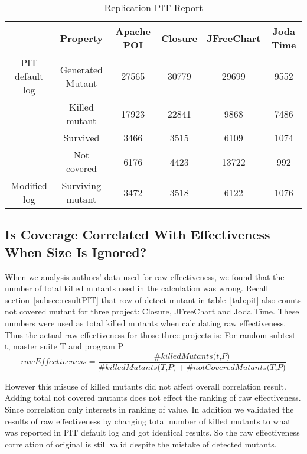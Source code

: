 \begin{table}[h]
	\caption{Replication PIT Report}
	\label{tab:pitrep}
	\begin{minipage}{\columnwidth}
		\begin{center}
			\begin{tabular}{|c|c|c|c|c|c|}
				\hline
				&Property & Apache POI & Closure & JFreeChart & Joda Time \\
				\hline
				PIT default log & Generated Mutant & 27565 & 30779 & 29699 & 9552\\
				& Killed mutant & 17923 & 22841  &9868 & 7486\\
				& Survived & 3466 & 3515 &6109 & 1074\\
				& Not covered & 6176 & 4423 & 13722 & 992\\
				\hline
				Modified log & Surviving mutant & 3472 & 3518 & 6122& 1076\\
				\hline
			\end{tabular}
		\end{center}
		\bigskip
	\end{minipage}
\end{table}

\subsection{Is Coverage Correlated With Effectiveness When Size Is Ignored?}
When we analysis authors' data used for raw effectiveness, we found that the number of total killed mutants used in the calculation was wrong. Recall section~\ref{subsec:resultPIT} that row of detect mutant in table~\ref{tab:pit} also counts not covered mutant for three project: Closure, JFreeChart and Joda Time. These numbers were used as total killed mutants when calculating raw effectiveness. Thus the actual raw effectiveness for those three projects is:
For random subtest t, master suite T and program P
\[\textit{rawEffectiveness} = \frac{\#\textit{killedMutants(t,P)}}{\#\textit{killedMutants(T,P)} + \#\textit{notCoveredMutants(T,P)}}\]

However this misuse of killed mutants did not affect overall correlation result. Adding total not covered mutants does not effect the ranking of raw effectiveness. Since correlation only interests in ranking of value,  In addition we validated the results of raw effectiveness by changing total number of killed mutants to what was reported in PIT default log and got identical results. So the raw effectiveness correlation of original is still valid despite the mistake of detected mutants.


